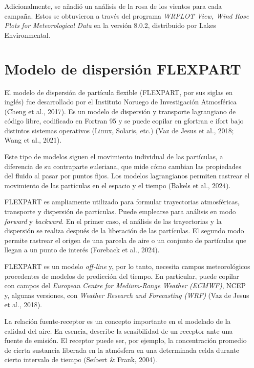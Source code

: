 Adicionalmente, se añadió un análisis de la rosa de los vientos para cada
campaña. Estos se obtuvieron a través del programa \textit{WRPLOT View, 
Wind Rose Plots for Meteorological Data} en la versión 8.0.2, distribuido 
por Lakes Environmental. 

\section{Modelo de dispersión FLEXPART}

El modelo de dispersión de partícula flexible (FLEXPART, por sus siglas
en inglés) fue desarrollado por el Instituto Noruego de Investigación
Atmosférica (Cheng et al., 2017). Es un modelo de dispersión y transporte lagrangiano de código 
libre, codificado en Fortran 95 y se puede copilar en gfortran e ifort 
bajo distintos sistemas operativos (Linux, Solaris, etc.)
(Vaz de Jesus et al., 2018; Wang et al., 2021). 

Este tipo de modelos siguen el movimiento individual de las partículas, 
a diferencia de su contraparte euleriana, que mide cómo cambian 
las propiedades del fluido
al pasar por puntos fijos. Los modelos lagrangianos permiten rastrear
el movimiento de las partículas en el espacio y el tiempo
(Bakels et al., 2024).

FLEXPART es ampliamente utilizado para formular trayectorias
atmosféricas, transporte y dispersión de partículas. Puede emplearse
para análisis en modo \textit{forward} y \textit{backward}. En el primer
caso, el análisis de las trayectorias y la dispersión se realiza
después de la liberación de las partículas. El segundo modo permite
rastrear el origen de una parcela de aire o un conjunto de partículas
que llegan a un punto de interés (Foreback et al., 2024).

FLEXPART es un modelo \textit{off-line} y, por lo tanto, necesita campos
meteorológicos procedentes de modelos de predicción del tiempo. En particular, 
puede copilar con campos del \textit{European Centre for Medium-Range 
Weather (ECMWF)}, NCEP y, algunas versiones, con \textit{Weather Research and Forecasting
(WRF)} (Vaz de Jesus et al., 2018).

La relación fuente-receptor es un concepto importante en el modelado de
la calidad del aire. En esencia, describe la sensibilidad de un
receptor ante una fuente de emisión. El receptor puede ser, por
ejemplo, la concentración promedio de cierta sustancia liberada en la
atmósfera en una determinada celda durante cierto intervalo de tiempo
(Seibert \& Frank, 2004).

